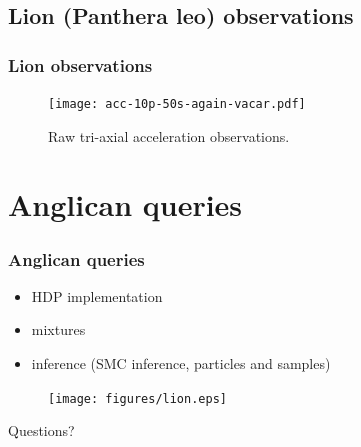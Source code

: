 \documentclass[aspectratio=169]{beamer}
\begin{document}

\subsection{Lion (Panthera leo) observations}
\begin{frame}
    \frametitle{Lion observations}

    \begin{figure}
        \texttt{[image: acc-10p-50s-again-vacar.pdf]}
        \caption{Raw tri-axial acceleration observations.}
    \end{figure}


\end{frame}



\section{Anglican queries}
\begin{frame}
    \frametitle{Anglican queries}

    \begin{itemize}
        \item HDP implementation
        \item mixtures
        \item inference (SMC inference, particles and samples)
    \end{itemize}

\end{frame}


\fi


%
%


\begin{frame}
    \begin{figure}
        \texttt{[image: figures/lion.eps]}
    \end{figure}
    \Huge{\centerline{Questions?}}
\end{frame}

\end{document}
